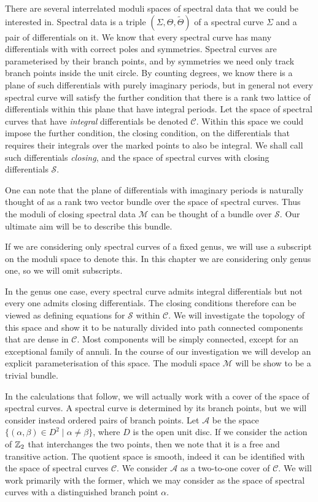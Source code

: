 There are several interrelated moduli spaces of spectral data that we could be interested in. Spectral data is a triple $(Σ,Θ,\tilde{Θ})$ of a spectral curve $Σ$ and a pair of differentials on it. We know that every spectral curve has many differentials with with correct poles and symmetries. Spectral curves are parameterised by their branch points, and by symmetries we need only track branch points inside the unit circle. By counting degrees, we know there is a plane of such differentials with purely imaginary periods, but in general not every spectral curve will satisfy the further condition that there is a rank two lattice of differentials within this plane that have integral periods. Let the space of spectral curves that have \emph{integral} differentials be denoted $\mathcal{C}$. Within this space we could impose the further condition, the closing condition, on the differentials that requires their integrals over the marked points to also be integral. We shall call such differentials \emph{closing}, and the space of spectral curves with closing differentials $\mathcal{S}$.

One can note that the plane of differentials with imaginary periods is naturally thought of as a rank two vector bundle over the space of spectral curves. Thus the moduli of closing spectral data $\mathcal{M}$ can be thought of a bundle over $\mathcal{S}$. Our ultimate aim will be to describe this bundle.

If we are considering only spectral curves of a fixed genus, we will use a subscript on the moduli space to denote this. In this chapter we are considering only genus one, so we will omit subscripts.

In the genus one case, every spectral curve admits integral differentials but not every one admits closing differentials. The closing conditions therefore can be viewed as defining equations for $\mathcal{S}$ within $\mathcal{C}$. We will investigate the topology of this space and show it to be naturally divided into path connected components that are dense in $\mathcal{C}$. Most components will be simply connected, except for an exceptional family of annuli. In the course of our investigation we will develop an explicit parameterisation of this space. The moduli space $\mathcal{M}$ will be show to be a trivial bundle.

In the calculations that follow, we will actually work with a cover of the space of spectral curves. A spectral curve is determined by its branch points, but we will consider instead ordered pairs of branch points. Let $\mathcal{A}$ be the space $\{ (α,β) \in D^2 \mid α \neq β \}$, where $D$ is the open unit disc. If we consider the action of $\mathbb{Z}_2$ that interchanges the two points, then we note that it is a free and transitive action. The quotient space is smooth, indeed it can be identified with the space of spectral curves $\mathcal{C}$. We consider $\mathcal{A}$ as a two-to-one cover of $\mathcal{C}$. We will work primarily with the former, which we may consider as the space of spectral curves with a distinguished branch point $α$.

